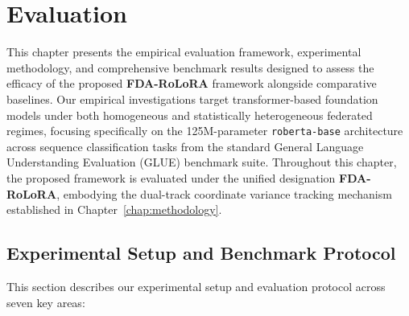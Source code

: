 \chapter{Evaluation}
\label{chap:evaluation}

This chapter presents the empirical evaluation framework, experimental methodology, and comprehensive benchmark results designed to assess the efficacy of the proposed \textbf{FDA-RoLoRA} framework alongside comparative baselines. Our empirical investigations target transformer-based foundation models under both homogeneous and statistically heterogeneous federated regimes, focusing specifically on the 125M-parameter \texttt{roberta-base} architecture across sequence classification tasks from the standard General Language Understanding Evaluation (GLUE) benchmark suite. Throughout this chapter, the proposed framework is evaluated under the unified designation \textbf{FDA-RoLoRA}, embodying the dual-track coordinate variance tracking mechanism established in Chapter~\ref{chap:methodology}.

\section{Experimental Setup and Benchmark Protocol}
\label{sec:eval_setup}

This section describes our experimental setup and evaluation protocol across seven key areas:

